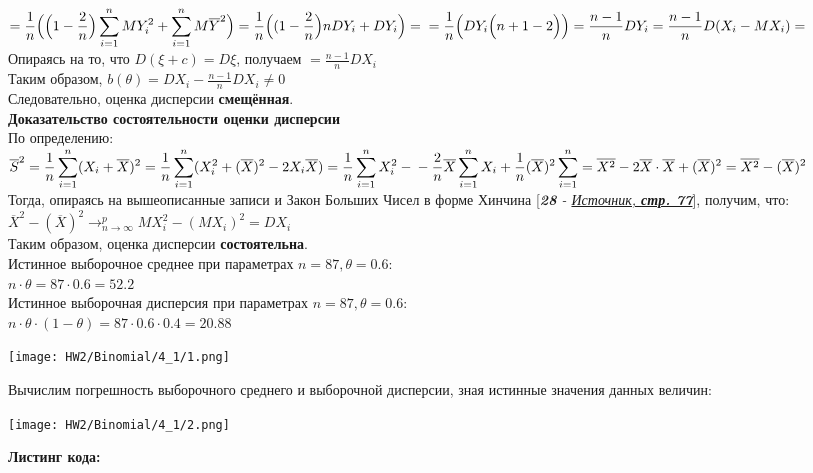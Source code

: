 \documentclass[14pt,a4paper,oneside]{extbook}
\begin{document}
    $\displaystyle = \frac{1}{n}\Big(\Big(1 - \frac{2}{n}\Big)\sum_{i = 1}^{n}MY_{i}^{2} + \sum_{i = 1}^{n}M\overline{Y}^{2}\Big) = \frac{1}{n}\Big((1 - \frac{2}{n}\Big)nDY_{i} + DY_{i}\Big) =\\= \frac{1}{n}\Big(DY_{i}\Big(n + 1 - 2\Big)\Big) = \frac{n - 1}{n}DY_{i} = \frac{n - 1}{n}D(X_{i} - MX_{i}) = $ Опираясь на то, что $\displaystyle D(\xi + c) = D\xi$, получаем $\displaystyle = \frac{n - 1}{n}DX_{i}$
    \\
    Таким образом, $\displaystyle b(\theta) = DX_{i} - \frac{n - 1}{n}DX_{i} \neq 0$\\
    Следовательно, оценка дисперсии \textbf{смещённая}.\\
    
    \textbf{Доказательство состоятельности оценки дисперсии}\\
    По определению: $\displaystyle \overline{S}^{2} = \frac{1}{n}\sum_{i = 1}^{n}(X_{i} + \overline{X})^{2} = \frac{1}{n}\sum_{i = 1}^{n}(X_{i}^{2} + (\overline{X})^{2} - 2X_{i}\overline{X}) = \frac{1}{n}\sum_{i=1}^{n}X_{i}^{2} -\\- \frac{2}{n}\overline{X}\sum_{i=1}^{n}X_{i} + \frac{1}{n}(\overline{X})^{2}\sum_{i=1}^{n} = \overline{X^{2}} - 2\overline{X}\cdot\overline{X} + (\overline{X})^{2} = \overline{X^{2}} - (\overline{X})^{2}$\\
    Тогда, опираясь на вышеописанные записи и Закон Больших Чисел в форме Хинчина [\textit{\textbf{28} - \href{http://angtu.ru/universitet/kafedry-angtu/math/posobiya/metTV_ch_2.pdf}{Источник, \textbf{стр. 77}}}], получим, что:\\
    $\displaystyle\overline{X}^{2} - (\overline{X})^{2} \longrightarrow_{n \longrightarrow \infty}^{p} MX_{i}^{2} - (MX_{i})^{2} = DX_{i}$\\
    Таким образом, оценка дисперсии \textbf{состоятельна}.\\
    
    Истинное выборочное среднее при параметрах $\displaystyle n = 87, \theta = 0.6$:\\
    $\displaystyle n \cdot \theta = 87 \cdot 0.6 = 52.2$\\
    Истинное выборочная дисперсия при параметрах $\displaystyle n = 87, \theta = 0.6:$\\
    $\displaystyle n \cdot \theta \cdot (1 - \theta) = 87 \cdot 0.6 \cdot 0.4 = 20.88$
    \\
    \begin{center}
        \texttt{[image: HW2/Binomial/4\_1/1.png]}
    \end{center}
    Вычислим погрешность выборочного среднего и выборочной дисперсии, зная истинные значения данных величин:
    \begin{center}
        \texttt{[image: HW2/Binomial/4\_1/2.png]}
    \end{center}
    \textbf{Листинг кода:}
    
    
\end{document}
